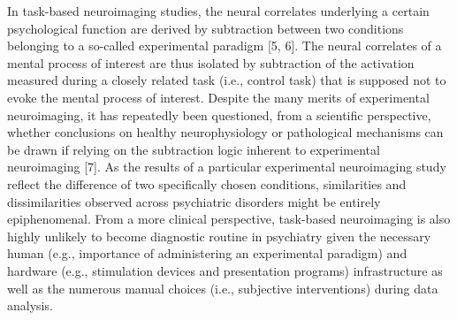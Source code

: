 \documentclass[authoryear,review,3p]{elsarticle}
\begin{document}
In task-based neuroimaging studies, the neural correlates underlying a certain psychological function are derived by subtraction between two conditions belonging to a so-called experimental paradigm [5, 6]. The neural correlates of a mental process of interest are thus isolated by subtraction of the activation measured during a closely related task (i.e., control task) that is supposed not to evoke the mental process of interest. Despite the many merits of experimental neuroimaging, it has repeatedly been questioned, from a scientific perspective, whether conclusions on healthy neurophysiology or pathological mechanisms can be drawn if relying on the subtraction logic inherent to experimental neuroimaging [7]. As the results of a particular experimental neuroimaging study reflect the difference of two specifically chosen conditions, similarities and dissimilarities observed across psychiatric disorders might be entirely epiphenomenal. From a more clinical perspective, task-based neuroimaging is also highly unlikely to become diagnostic routine in psychiatry given the necessary human (e.g., importance of administering an experimental paradigm) and hardware (e.g., stimulation devices and presentation programs) infrastructure as well as the numerous manual choices (i.e., subjective interventions) during data analysis.
\end{document}
